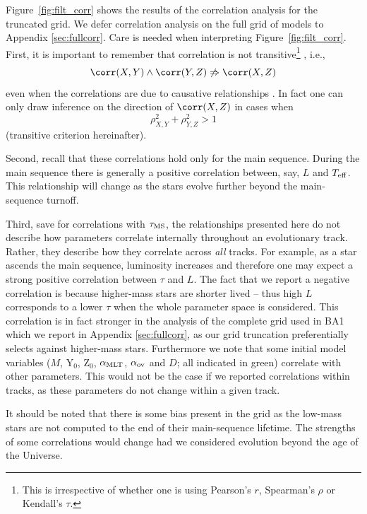 Figure~\ref{fig:filt_corr} shows the results of the correlation analysis for the truncated grid.
We defer correlation analysis on the full grid of models to Appendix \ref{sec:fullcorr}. 
Care is needed when interpreting Figure~\ref{fig:filt_corr}. 
First, it is important to remember that correlation is not transitive\footnote{This is irrespective of whether one is using Pearson's $r$, Spearman's $\rho$ or Kendall's $\tau$.} \citep{lang}, i.e.,
\begin{equation}
\corr(X,Y) \wedge \corr(Y,Z) \not \Rightarrow \corr(X,Z)
\end{equation}
even when the correlations are due to causative relationships \citep{stav}.
In fact one can only draw inference on the direction of $\corr(X,Z)$ in cases when 
\begin{equation}
\rho_{X,Y}^2 + \rho_{Y,Z}^2 > 1
\end{equation}
(transitive criterion hereinafter).

Second, recall that these correlations hold only for the main sequence. During the main sequence there is generally a positive correlation between, say, $L$ and $T_{\rm{eff}}$. 
This relationship will change as the stars evolve further beyond the main-sequence turnoff. 

Third, save for correlations with $\tau_{\rm{MS}}$, the relationships presented here do not describe how parameters correlate internally throughout an evolutionary track. Rather, they describe how they correlate across \emph{all} tracks. For example, as a star ascends the main sequence, luminosity increases and therefore one may expect a strong positive correlation between $\tau$ and $L$. The fact that we report a negative correlation is because higher-mass stars are shorter lived -- thus high $L$ corresponds to a lower $\tau$  when the whole parameter space is considered. This correlation is in fact stronger in the analysis of the complete grid used in BA1 which we report in Appendix \ref{sec:fullcorr}, as our grid truncation preferentially selects against higher-mass stars. 
Furthermore we note that some initial model variables ($M$, Y$_0$, Z$_0$, $\alpha_{\rm{MLT}}$, $\alpha_{\rm{ov}}$ and $D$; all indicated in green) correlate with other parameters.  This would not be the case if we reported correlations within tracks, as these parameters do not change within a given track. 

It should be noted that there is some bias present in the grid as the low-mass stars are not computed to the end of their main-sequence lifetime. The strengths of some correlations would change had we considered evolution beyond the age of the Universe. 
